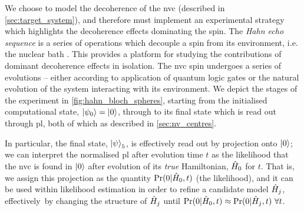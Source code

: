 We choose to model the decoherence of the \gls{nvc} (described in \cref{sec:target_system}), 
    and therefore must implement an experimental strategy which highlights 
    the decoherence effects dominating the spin. 
The \emph{Hahn echo sequence} is a series of operations which decouple a spin from its environment, i.e. the nuclear bath
    \cite{blok2014manipulating, childress2006coherent, rowan1965electron, charnock2001combined, gentile2020Operating}.
This provides a platform for studying the contributions of dominant decoherence effects in isolation. 
The \gls{nvc} spin undergoes a series of evolutions -- either according to application of quantum logic gates
    or the natural evolution of the system interacting with its environment.  
We depict the stages of the experiment in \cref{fig:hahn_bloch_spheres}, 
    starting from the initialised computational state, $\ket{\psi_0} = \ket{0}$,
    through to its final state which is read out through \gls{pl},
    both of which as described in \cref{sec:nv_centres}.
\par 

In particular, the final state, $\ket{\psi}_5$, is effectively read out by projection onto $\ket{0}$;
    we can interpret the normalised \gls{pl} after evolution time $t$ as the  \gls{likelihood} 
    that the \gls{nvc} is found in $\ket{0}$ after evolution of its \emph{true} Hamiltonian, $\hat{H}_0$ for $t$. 
That is, we assign this projection as the quantity $\Pr(0 | \hat{H}_0, t)$ (the  \gls{likelihood}), 
    and it can be used within \gls{likelihood} estimation in order to refine a candidate model $\hat{H}_j$, 
    effectively\footnotemark \ by changing the structure of 
    $\hat{H}_j$ until $\Pr(0 | \hat{H}_0, t) \approx \Pr(0 | \hat{H}_j, t) \ \forall t$. 

\par 


